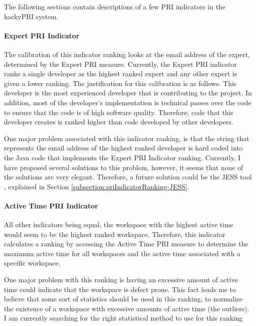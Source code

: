 The following sections contain descriptions of a few PRI indicators in the
hackyPRI system. 


\paragraph{Expert PRI Indicator} 
The calibration of this indicator ranking looks at the email address of the
expert, determined by the Expert PRI measure. Currently, the Expert PRI
indicator ranks a single developer as the highest ranked expert and any
other expert is given a lower ranking. The justification for this
calibration is as follows. This developer is the most experienced developer
that is contributing to the project. In addition, most of the developer's
implementation is technical passes over the code to ensure that the code
is of high software quality. Therefore, code that this developer creates is
ranked higher than code developed by other developers.

One major problem associated with this indicator ranking, is that the
string that represents the email address of the highest ranked developer is
hard coded into the Java code that implements the Expert PRI Indicator
ranking. Currently, I have proposed several solutions to this problem,
however, it seems that none of the solutions are very elegant. Therefore, a
future solution could be the JESS tool \cite{Jess}, explained in Section
\ref{subsection:priIndicatorRanking-JESS}.


\paragraph{Active Time PRI Indicator}
All other indicators being equal, the workspace with the highest active
time would seem to be the highest ranked workspace. Therefore, this
indicator calculates a ranking by accessing the Active Time PRI measure to
determine the maximum active time for all workspaces and the active time
associated with a specific workspace. 

One major problem with this ranking is having an excessive amount of active
time could indicate that the workspace is defect prone. This fact leads me
to believe that some sort of statistics should be used in this ranking, to
normalize the existence of a workspace with excessive amounts of active
time (the outliers). I am currently searching for the right statistical
method to use for this ranking


